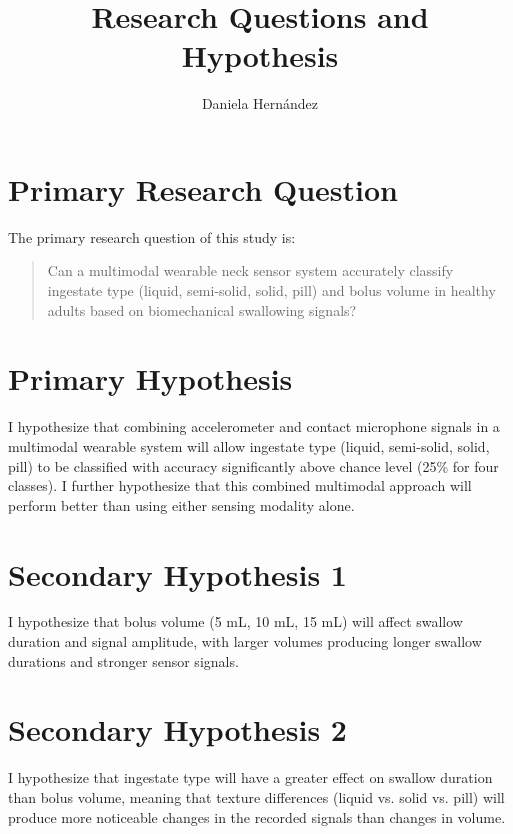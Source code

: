 \documentclass[conference]{IEEEtran}
\begin{document}
\title{Research Questions and Hypothesis}

\author{
Daniela Hernández\\
}

\maketitle

\section{Primary Research Question}
The primary research question of this study is:
\begin{quote}
Can a multimodal wearable neck sensor system accurately classify ingestate type (liquid, semi-solid, solid, pill) and bolus volume in healthy adults based on biomechanical swallowing signals?
\end{quote}

\section{Primary Hypothesis}
I hypothesize that combining accelerometer and contact microphone signals in a multimodal wearable system will allow ingestate type (liquid, semi-solid, solid, pill) to be classified with accuracy significantly above chance level (25\% for four classes). I further hypothesize that this combined multimodal approach will perform better than using either sensing modality alone.

\section{Secondary Hypothesis 1}
I hypothesize that bolus volume (5 mL, 10 mL, 15 mL) will affect swallow duration and signal amplitude, with larger volumes producing longer swallow durations and stronger sensor signals.

\section{Secondary Hypothesis 2}
I hypothesize that ingestate type will have a greater effect on swallow duration than bolus volume, meaning that texture differences (liquid vs. solid vs. pill) will produce more noticeable changes in the recorded signals than changes in volume.
\end{document}
